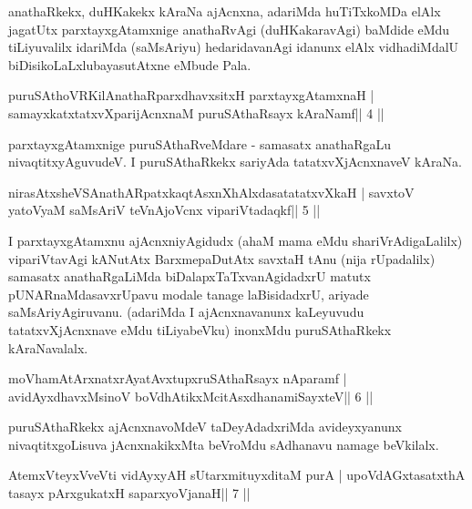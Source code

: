\begin{artha}
anathaRkekx, duHKakekx kAraNa ajAcnxna, adariMda huTiTxkoMDa elAlx jagatUtx parxtayxgAtamxnige anathaRvAgi (duHKakaravAgi) baMdide eMdu tiLiyuvalilx idariMda (saMsAriyu) hedaridavanAgi idanunx elAlx vidhadiMdalU biDisikoLaLxlu\break bayasutAtxne eMbude Pala.
\end{artha}

\begin{shl}
puruSAthoVR\s KilAnathaRparxdhavxsitxH parxtayxgAtamxnaH |
samayxkatxtatxvXparijAcnxnaM puruSAthaRsayx kAraNamf\hfill || 4 ||
\end{shl}

\begin{artha}
parxtayxgAtamxnige puruSAthaRveMdare - samasatx anathaRgaLu  nivaqtitxyAguvudeV. I puruSAthaRkekx sariyAda tatatxvXjAcnxnaveV kAraNa.
\end{artha}


\begin{shl}
nirasAtxsheVSAnathARpatxkaqtAsxnXhAlxdasatatatxvXkaH |
savxtoV yatoV\s yaM saMsAriV teVnAjoVcnx vipariVtadaqkf\hfill || 5 ||
\end{shl}

\begin{artha}
I parxtayxgAtamxnu ajAcnxniyAgidudx (ahaM mama eMdu shariVrAdigaLalilx) 
vipariVtavAgi kANutAtx BarxmepaDutAtx savxtaH tAnu (nija rUpadalilx) samasatx anathaRgaLiMda biDalapxTaTxvanAgidadxrU matutx pUNARnaMdasavxrUpavu modale tanage laBisidadxrU, ariyade saMsAriyAgiruvanu. (adariMda I ajAcnxnavanunx kaLeyuvudu tatatxvXjAcnxnave eMdu tiLiyabeVku) inonxMdu puruSAthaRkekx kAraNavalalx.  \mdash 
\end{artha}

\begin{shl}
moVhamAtArxnatxrAyatAvxtupxruSAthaRsayx nAparamf |
avidAyxdhavxMsinoV boVdhAtikxMcitAsxdhanamiSayxteV\hfill || 6 ||
\end{shl}

\begin{artha}
puruSAthaRkekx ajAcnxnavoMdeV taDeyAdadxriMda avideyxyanunx nivaqtitxgoLisuva jAcnxnakikxMta beVroMdu sAdhanavu namage beVkilalx.
\end{artha}


\begin{shl}
AtemxVteyxVveVti vidAyxyAH sUtarxmituyxditaM purA |
upoVdAGxtasatxthA tasayx pArxgukatxH saparxyoVjanaH\hfill || 7 ||
\end{shl}

